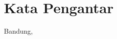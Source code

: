 \chapter*{Kata Pengantar}

\Blindtext

\begin{flushright}
Bandung, \thedatedmy
\\[2cm]

\theauthor
\end{flushright}
